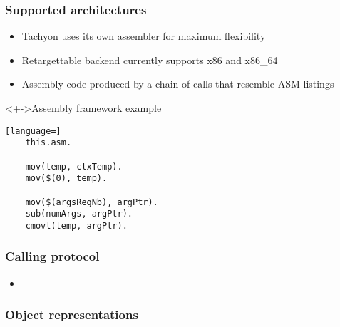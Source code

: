 \begin{frame}[fragile]
\frametitle{\bf Supported architectures}

\begin{itemize}
    \item Tachyon uses its own assembler for maximum flexibility
    \item Retargettable backend currently supports x86 and x86\_64
    \item Assembly code produced by a chain of calls that resemble ASM
    listings
\end{itemize}

\begin{block}<+->{Assembly framework example}
\begin{lstlisting}[language=]
    this.asm.

    mov(temp, ctxTemp).
    mov($(0), temp).
    
    mov($(argsRegNb), argPtr).
    sub(numArgs, argPtr).
    cmovl(temp, argPtr).
\end{lstlisting}
\end{block}
\end{frame}

\begin{frame}
\frametitle{\bf Calling protocol}

\begin{itemize}
    \item 

    
\end{itemize}
\end{frame}

\begin{frame}
\frametitle{\bf Object representations}


\end{frame}

% 


